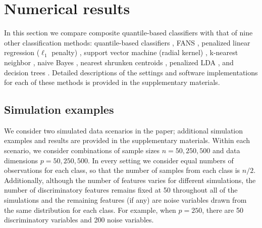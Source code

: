 

\section{Numerical results}
\label{sec:numerical-results}

In this section we compare composite quantile-based classifiers with that of
nine other classification methods: quantile-based classifiers \cite{hennig2016},
FANS \cite{fan2016}, penalized linear regression ($\ell_1$ penalty)
\cite{park2007}, support vector machine (radial kernel) \cite{cortes1995},
k-nearest neighbor \cite{cover1967}, naive Bayes \cite{hastie2009}, nearest
shrunken centroids \cite{tibshirani2002}, penalized LDA \cite{witten2011}, and
decision trees \cite{breiman1984}.  Detailed descriptions of the settings and
software implementations for each of these methods is provided in the
supplementary materials.


\subsection{Simulation examples}
\label{sec:simulated-data-scenarios}

We consider two simulated data scenarios in the paper; additional simulation
examples and results are provided in the supplementary materials.  Within each
scenario, we consider combinations of sample sizes $n = 50, 250, 500$ and data
dimensions $p = 50, 250, 500$.  In every setting we consider equal numbers of
observations for each class, so that the number of samples from each class is
$n / 2$.  Additionally, although the number of features varies for different
simulations, the number of discriminatory features remains fixed at 50
throughout all of the simulations and the remaining features (if any) are noise
variables drawn from the same distribution for each class.  For example, when
$p = 250$, there are 50 discriminatory variables and 200 noise variables.


